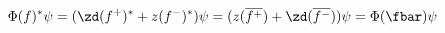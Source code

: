 \begin{equation*}
  \Phi(f)^*\psi = (\zd(f^+)^* + z(f^-)^*)\psi = (z(\overline{f^+}) + \zd(\overline{f^-}))\psi = \Phi(\fbar)\psi
\end{equation*}

